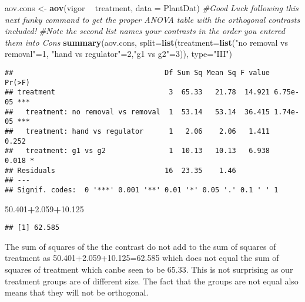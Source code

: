 \documentclass[]{article}
\newenvironment{Shaded}{\begin{snugshade}}{\end{snugshade}}
\newcommand{\KeywordTok}[1]{\textcolor[rgb]{0.13,0.29,0.53}{\textbf{#1}}}
\newcommand{\DataTypeTok}[1]{\textcolor[rgb]{0.13,0.29,0.53}{#1}}
\newcommand{\DecValTok}[1]{\textcolor[rgb]{0.00,0.00,0.81}{#1}}
\newcommand{\FloatTok}[1]{\textcolor[rgb]{0.00,0.00,0.81}{#1}}
\newcommand{\StringTok}[1]{\textcolor[rgb]{0.31,0.60,0.02}{#1}}
\newcommand{\CommentTok}[1]{\textcolor[rgb]{0.56,0.35,0.01}{\textit{#1}}}
\newcommand{\OperatorTok}[1]{\textcolor[rgb]{0.81,0.36,0.00}{\textbf{#1}}}
\newcommand{\NormalTok}[1]{#1}
\begin{document}
\begin{Shaded}
\begin{Highlighting}[]
\NormalTok{aov.cons <-}\StringTok{ }\KeywordTok{aov}\NormalTok{(vigor }\OperatorTok{~}\StringTok{ }\NormalTok{treatment, }\DataTypeTok{data =}\NormalTok{ PlantDat)}
\CommentTok{#Good Luck following this next funky command to get the proper ANOVA table with the orthogonal contrasts included!}
\CommentTok{#Note the second list names your contrasts in the order you entered them into Cons}
\KeywordTok{summary}\NormalTok{(aov.cons, }\DataTypeTok{split=}\KeywordTok{list}\NormalTok{(}\DataTypeTok{treatment=}\KeywordTok{list}\NormalTok{(}\StringTok{"no removal vs removal"}\NormalTok{=}\DecValTok{1}\NormalTok{, }\StringTok{"hand vs regulator"}\NormalTok{=}\DecValTok{2}\NormalTok{,}\StringTok{"g1 vs g2"}\NormalTok{=}\DecValTok{3}\NormalTok{)), }\DataTypeTok{type=}\StringTok{"III"}\NormalTok{)}
\end{Highlighting}
\end{Shaded}

\begin{verbatim}
##                                    Df Sum Sq Mean Sq F value   Pr(>F)    
## treatment                           3  65.33   21.78  14.921 6.75e-05 ***
##   treatment: no removal vs removal  1  53.14   53.14  36.415 1.74e-05 ***
##   treatment: hand vs regulator      1   2.06    2.06   1.411    0.252    
##   treatment: g1 vs g2               1  10.13   10.13   6.938    0.018 *  
## Residuals                          16  23.35    1.46                     
## ---
## Signif. codes:  0 '***' 0.001 '**' 0.01 '*' 0.05 '.' 0.1 ' ' 1
\end{verbatim}

\begin{Shaded}
\begin{Highlighting}[]
\FloatTok{50.401}\OperatorTok{+}\FloatTok{2.059}\OperatorTok{+}\FloatTok{10.125}
\end{Highlighting}
\end{Shaded}

\begin{verbatim}
## [1] 62.585
\end{verbatim}

The sum of squares of the the contrast do not add to the sum of squares
of treatment as 50.401+2.059+10.125=62.585 which does not equal the sum
of squares of treatment which canbe seen to be 65.33. This is not
surprising as our treatment groups are of different size. The fact that
the groups are not equal also means that they will not be orthogonal.
\end{document}
